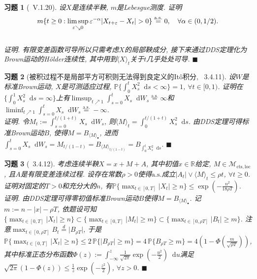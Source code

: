 \documentclass{ctexart}
\theoremstyle{definition}
\theoremstyle{remark}
\theoremstyle{plain}
\newtheorem{Ex}{习题}[section]
\newenvironment{Prf}{\vspace{1ex}\textbf{\\}{\color{red}\textit{证明}}.\normalfont}{\color{red}\hfill$\blacksquare$\vspace{1ex}\par}
\newcommand{\1}{\mathbbm{1}}				%
\newcommand{\as}{\mathrm{a.s.}}				%
\renewcommand{\P}{\mathbb{P}}				%
\newcommand{\agp}[1]{\langle #1 \rangle}	%
\newcommand{\abs}[1]{\lvert#1\rvert}			%
\newcommand{\R}{\mathbb{R}}					%
\renewcommand*{\d}{\mathop{}\!\mathrm{d}}	%
\begin{document}
\begin{Ex}[\cite{Revuz-Yor}~V.1.20]
设$X$是连续半鞅, $m$是Lebesgue测度. 证明\[ m\{ t \ge 0 : \limsup_{\varepsilon\searrow0} \varepsilon^{-\alpha}\abs{X_{t+\varepsilon}-X_{t}} > 0 \} \stackrel{\as}{=} 0 , \quad \forall \alpha \in (0,1/2) .
\vspace{-4.5ex}\]
\begin{Prf}
有限变差函数可导所以只需考虑$X$的局部鞅成分, 接下来通过DDS定理化为Brown运动的H\"{o}lder连续性, 其中用到$\agp{X}_{t}$关于$t$几乎处处可导.
\end{Prf}
\end{Ex}


\begin{Ex}[被积过程不是局部平方可积则无法得到良定义的It\^{o}积分, \cite{Karatzas-Shreve--GTM113}~3.4.11]
设$W$是标准Brown运动, $X$是可测适应过程, $\P\{ \int_{0}^{t} X_{s}^{2} \d s < \infty \} = 1$, $\forall t \in [0,1)$. 证明在$\{ \int_{0}^{1} X_{s}^{2} \d s = \infty \}$上有$\limsup_{t\nearrow1} \int_{s=0}^{t} X_{s} \d W_{s} \stackrel{\as}{=} \infty$和$\liminf_{t\nearrow1} \int_{s=0}^{t} X_{s} \d W_{s} \stackrel{\as}{=} -\infty$.
\begin{Prf}
令$M_{t} := \int_{s=0}^{t/(1+t)} X_{s} \d W_{s}$, 则$\agp{M}_{t} = \int_{0}^{t/(1+t)} X_{s}^{2} \d s$. 由DDS定理可得标准Brown运动$B$, 使得$M = B_{\agp{M}_{\bullet}}$, 进而$\int_{s=0}^{t} X_{s} \d W_{s} = M_{t/(1-t)} = B_{\agp{M}_{t/(1-t)}} = B_{\int_{0}^{t} X_{s}^{2} \d s}$.
\end{Prf}
\end{Ex}


\begin{Ex}[\cite{Karatzas-Shreve--GTM113}~3.4.12]
考虑连续半鞅$X = x + M + A$, 其中初值$x \in \R$给定, $M \in \mathcal{M}_{\mathrm{cts},\mathrm{loc}}$, 且$A$是有限变差连续过程. 设存在常数$\rho > 0$使得$\as$成立$\abs{A_{t}} \vee \agp{M}_{t} \le \rho t$, $\forall t \ge 0$. 证明对固定的$T > 0$和充分大的$n$, 有$\P\{ \max_{t \in [0,T]} \abs{X_{t}} \ge n \} \le \exp(-\frac{n^2}{18\rho T})$.
\begin{Prf}
由DDS定理可得零初值标准Brown运动$B$使得$M = B_{\agp{M}_{\bullet}}$. 记$m := n -\abs{x} -\rho T$, 依题设可知$\{ \max_{t \in [0,T]} \abs{X_{t}} \ge n \} \subset \{ \max_{t \in [0,T]} \abs{M_{t}} \ge m \} \subset \{ \max_{t \in [0, \rho T]} \abs{B_{t}} \ge m \}$. 注意$\max_{t \in [0, \rho T]} B_{t} \stackrel{d}{=} \abs{B_{\rho T}}$, 于是$\P\{ \max_{t \in [0,T]} \abs{X_{t}} \ge n \} \le 2 \, \P\{ \abs{B_{\rho T}} \ge m \} = 4 \, \P\{ B_{\rho T} \ge m \} = 4 (1-\Phi(\frac{m}{\sqrt{\rho T}}))$, 其中标准正态分布函数$\Phi(z) := \int_{-\infty}^{z} \frac{1}{\sqrt{2\pi}} \exp(-\frac{u^{2}}{2}) \d u$满足$\sqrt{2\pi} (1-\Phi(z)) \le \frac{1}{z} \exp(-\frac{z^{2}}{2})$, $\forall z > 0$.
\end{Prf}
\end{Ex}
\end{document}
